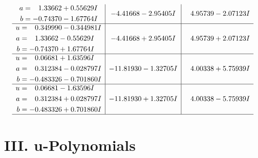 \documentclass[1p]{elsarticle_modified}
\theoremstyle{definition}
\begin{document}
$$\begin{array}{c|c|c}
\begin{aligned}
a &= \phantom{-}1.33662 + 0.55629 I \\
b &= -0.74370 - 1.67764 I\end{aligned}
 & -4.41668 - 2.95405 I & \phantom{-}4.95739 - 2.07123 I \\ \hline\begin{aligned}
u &= \phantom{-}0.349990 - 0.344981 I \\
a &= \phantom{-}1.33662 - 0.55629 I \\
b &= -0.74370 + 1.67764 I\end{aligned}
 & -4.41668 + 2.95405 I & \phantom{-}4.95739 + 2.07123 I \\ \hline\begin{aligned}
u &= \phantom{-}0.06681 + 1.63596 I \\
a &= \phantom{-}0.312384 - 0.028797 I \\
b &= -0.483326 - 0.701860 I\end{aligned}
 & -11.81930 - 1.32705 I & \phantom{-}4.00338 + 5.75939 I \\ \hline\begin{aligned}
u &= \phantom{-}0.06681 - 1.63596 I \\
a &= \phantom{-}0.312384 + 0.028797 I \\
b &= -0.483326 + 0.701860 I\end{aligned}
 & -11.81930 + 1.32705 I & \phantom{-}4.00338 - 5.75939 I\\
 \hline 
 \end{array}$$\newpage
\newpage\renewcommand{\arraystretch}{1}
\centering \section*{ III. u-Polynomials}
\end{document}
